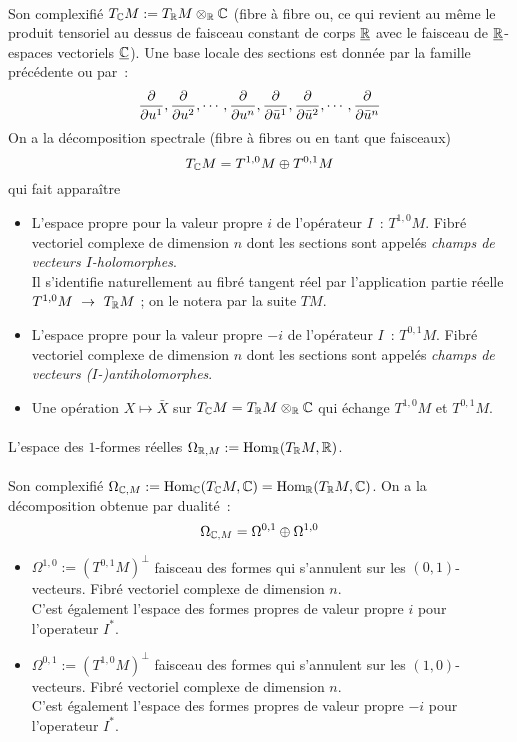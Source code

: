 \documentclass[12pt,draft]{article}
\begin{document}
\paragraph{} Son complexifié $T_{\mathbb{C}} M := T_{\mathbb{R}} M \otimes_{\mathbb{R}} \mathbb{C}$ (fibre à fibre ou, ce qui revient au même le produit tensoriel au dessus de faisceau constant de corps $\underline{\mathbb{R}}$ avec le faisceau de $\underline{\mathbb{R}}$-espaces vectoriels $\underline{\mathbb{C}}$).
Une base locale des sections est donnée par la famille précédente ou par~:
\[
\dfrac{\partial{}}{\partial{u^1}} , \dfrac{\partial{}}{\partial{u^2}} , \cdots , \dfrac{\partial{}}{\partial{u^{n}}} , \dfrac{\partial{}}{\partial{\bar{u}^1}} , \dfrac{\partial{}}{\partial{\bar{u}^2}} , \cdots , \dfrac{\partial{}}{\partial{\bar{u}^{n}}}
\]
On a la décomposition spectrale (fibre à fibres ou en tant que faisceaux)
\[
T_{\mathbb{C}} M = T^{1,0}M \oplus T^{0,1}M
\]
qui fait apparaître
\begin{itemize}
\item L'espace propre pour la valeur propre $i$ de l'opérateur $I$~: $T^{1,0}M$. Fibré vectoriel complexe de dimension $n$ dont les sections sont appelés \textit{champs de vecteurs $I$-holomorphes}.\\
Il s'identifie naturellement au fibré tangent réel par l'application partie réelle $T^{1,0}M~\rightarrow~T_{\mathbb{R}} M$ ; on le notera par la suite $TM$.
\item L'espace propre pour la valeur propre $-i$ de l'opérateur $I$~: $T^{0,1}M$. Fibré vectoriel complexe de dimension $n$ dont les sections sont appelés \textit{champs de vecteurs \mbox{($I$-)antiholomorphes}}.
\item Une opération $X \mapsto \bar{X}$ sur $T_{\mathbb{C}} M = T_{\mathbb{R}} M \otimes_{\mathbb{R}} \mathbb{C}$ qui échange $T^{1,0}M$ et $T^{0,1}M$.
\end{itemize}
\paragraph{} L'espace des $1$-formes réelles $\Omega_{\mathbb{R},M} := \text{Hom}_{\mathbb{R}}(T_{\mathbb{R}} M,\mathbb{R})$.
\paragraph{} Son complexifié $\Omega_{\mathbb{C},M} := \text{Hom}_{\mathbb{C}}(T_{\mathbb{C}} M,\mathbb{C}) = \text{Hom}_{\mathbb{R}}(T_{\mathbb{R}} M,\mathbb{C})$. On a la décomposition obtenue par dualité~:
\[
\Omega_{\mathbb{C},M} = \Omega^{0,1} \oplus \Omega^{1,0}
\]
\begin{itemize}
\item $\Omega^{1,0} := (T^{0,1}M)^\bot$ faisceau des formes qui s'annulent sur les $(0,1)$-vecteurs. Fibré vectoriel complexe de dimension $n$.\\
C'est également l'espace des formes propres de valeur propre $i$ pour l'operateur $I^*$.
\item $\Omega^{0,1} := (T^{1,0}M)^\bot$ faisceau des formes qui s'annulent sur les $(1,0)$-vecteurs. Fibré vectoriel complexe de dimension $n$.\\
C'est également l'espace des formes propres de valeur propre $-i$ pour l'operateur $I^*$.
\end{itemize}
\end{document}
